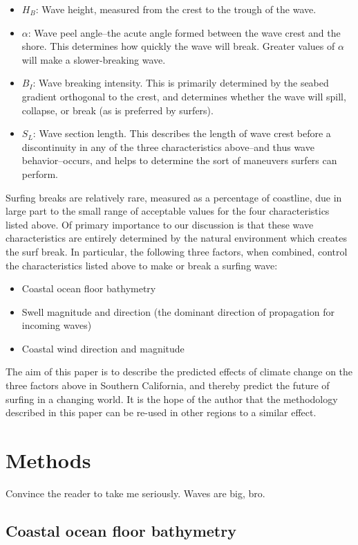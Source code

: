 \documentclass[12pt, letterpaper]{article}
\begin{document}
	\begin{itemize}
		\item $H_B$: Wave height, measured from the crest to the trough of the wave.
		\item $\alpha$: Wave peel angle--the acute angle formed between the wave crest and the shore. This determines how quickly the wave will break. Greater values of $\alpha$ will make a slower-breaking wave.
		\item $B_I$: Wave breaking intensity. This is primarily determined by the seabed gradient orthogonal to the crest, and determines whether the wave will spill, collapse, or break (as is preferred by surfers).
		\item $S_L$: Wave section length. This describes the length of wave crest before a discontinuity in any of the three characteristics above--and thus wave behavior--occurs, and helps to determine the sort of maneuvers surfers can perform.
	\end{itemize}

	Surfing breaks are relatively rare, measured as a percentage of coastline, due in large part to the small range of acceptable values for the four characteristics listed above. Of primary importance to our discussion is that these wave characteristics are entirely determined by the natural environment which creates the surf break. In particular, the following three factors, when combined, control the characteristics listed above to make or break a surfing wave: \citep{surfing-science}
	\begin{itemize}
		\item Coastal ocean floor bathymetry
		\item Swell magnitude and direction (the dominant direction of propagation for incoming waves)
		\item Coastal wind direction and magnitude
	\end{itemize}
	The aim of this paper is to describe the predicted effects of climate change on the three factors above in Southern California, and thereby predict the future of surfing in a changing world. It is the hope of the author that the methodology described in this paper can be re-used in other regions to a similar effect.

	\section{Methods}
	Convince the reader to take me seriously. Waves are big, bro.
	\subsection{Coastal ocean floor bathymetry}
\end{document}
